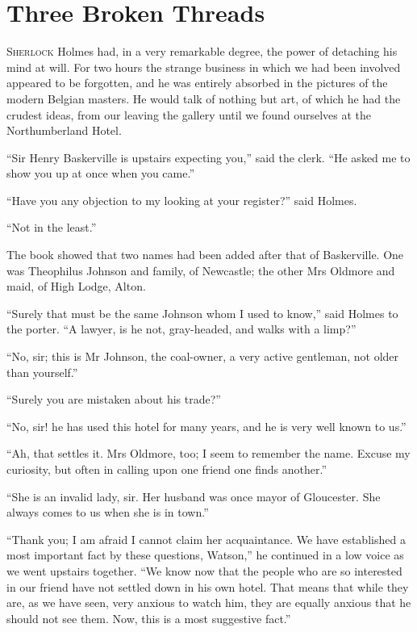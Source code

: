 \documentclass[paper=5.5in:8.5in,BCOR=7mm,twoside,DIV=calc,12pt,usegeometry,openany,chapterprefix,endperiod,headings=big]{scrbook} %
\begin{document}
\chapter{Three Broken Threads}
\lettrine[lines=1]{S}{herlock} Holmes had, in a very remarkable degree, the power of detaching his mind at will. For two hours the strange business in which we had been involved appeared to be forgotten, and he was entirely absorbed in the pictures of the modern Belgian masters. He would talk of nothing but art, of which he had the crudest ideas, from our leaving the gallery until we found ourselves at the Northumberland Hotel.

\enquote{Sir Henry Baskerville is upstairs expecting you,} said the clerk. \enquote{He asked me to show you up at once when you came.}

\enquote{Have you any objection to my looking at your register?} said Holmes.

\enquote{Not in the least.}

The book showed that two names had been added after that of Baskerville. One was Theophilus Johnson and family, of Newcastle; the other Mrs Oldmore and maid, of High Lodge, Alton.

\enquote{Surely that must be the same Johnson whom I used to know,} said Holmes to the porter. \enquote{A lawyer, is he not, gray-headed, and walks with a limp?}

\enquote{No, sir; this is Mr Johnson, the coal-owner, a very active gentleman, not older than yourself.}

\enquote{Surely you are mistaken about his trade?}

\enquote{No, sir! he has used this hotel for many years, and he is very well known to us.}

\enquote{Ah, that settles it. Mrs Oldmore, too; I seem to remember the name. Excuse my curiosity, but often in calling upon one friend one finds another.}

\enquote{She is an invalid lady, sir. Her husband was once mayor of Gloucester. She always comes to us when she is in town.}

\enquote{Thank you; I am afraid I cannot claim her acquaintance. We have established a most important fact by these questions, Watson,} he continued in a low voice as we went upstairs together. \enquote{We know now that the people who are so interested in our friend have not settled down in his own hotel. That means that while they are, as we have seen, very anxious to watch him, they are equally anxious that he should not see them. Now, this is a most suggestive fact.}
\end{document}
